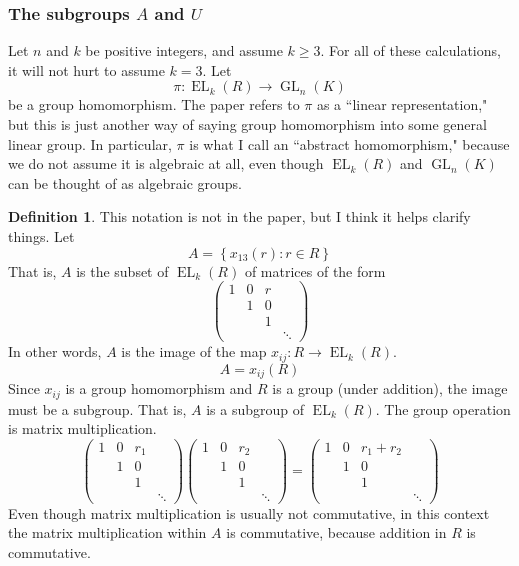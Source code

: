 \documentclass[12pt]{article}
\theoremstyle{definition}
\newtheorem{definition}[theorem]{Definition}
\numberwithin{theorem}{subsection}
\newcommand{\lb}{\left\{}
\newcommand{\rb}{\right\}}
\DeclareMathOperator{\EL}{EL}
\DeclareMathOperator{\GL}{GL}
\begin{document}
\subsubsection*{The subgroups $A$ and $U$}

Let $n$ and $k$ be positive integers, and assume $k \ge 3$. For all of these calculations, it will not hurt to assume $k = 3$. Let 
\[
	\pi:\EL_k(R) \to \GL_n(K)
\]
be a group homomorphism. The paper refers to $\pi$ as a ``linear representation," but this is just another way of saying group homomorphism into some general linear group. In particular, $\pi$ is what I call an ``abstract homomorphism," because we do not assume it is algebraic at all, even though $\EL_k(R)$ and $\GL_n(K)$ can be thought of as algebraic groups.

\begin{definition}
This notation is not in the paper, but I think it helps clarify things. Let
\[
	A = \lb x_{13}(r) : r \in R \rb
\]
That is, $A$ is the subset of $\EL_k(R)$ of matrices of the form
\[
	\begin{pmatrix}
		1 & 0 & r \\
		& 1 & 0 \\
		& & 1 \\
		&&& \ddots
	\end{pmatrix}
\]
In other words, $A$ is the image of the map $x_{ij}:R \to \EL_k(R)$.
\[
	A = x_{ij}(R)
\]
Since $x_{ij}$ is a group homomorphism and $R$ is a group (under addition), the image must be a subgroup. That is, $A$ is a subgroup of $\EL_k(R)$. The group operation is matrix multiplication.
\[
	\begin{pmatrix}
		1 & 0 & r_1 \\
		& 1 & 0 \\
		& & 1 \\
		&&& \ddots
	\end{pmatrix}
	\begin{pmatrix}
		1 & 0 & r_2 \\
		& 1 & 0 \\
		& & 1 \\
		&&& \ddots
	\end{pmatrix}
	=
	\begin{pmatrix}
		1 & 0 & r_1 + r_2 \\
		& 1 & 0 \\
		& & 1 \\
		&&& \ddots
	\end{pmatrix}
\]
Even though matrix multiplication is usually not commutative, in this context the matrix multiplication within $A$ is commutative, because addition in $R$ is commutative.

\end{definition}
\end{document}
